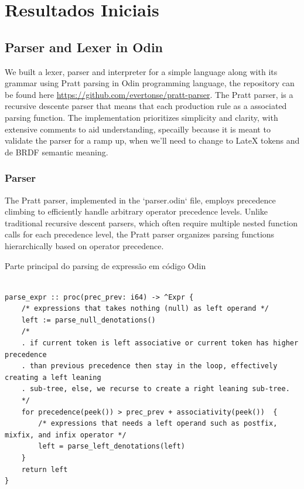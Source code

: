 \documentclass[english, 
               brazil, 
               bsc] %
               {dcomp-abntex2}
\begin{document}
\chapter{Resultados Iniciais}

\section{Parser and Lexer in Odin}

We built a lexer, parser and interpreter for a  simple language along with its grammar using Pratt parsing in Odin programming language, the repository can be found here \url{https://github.com/evertonse/pratt-parser}. The Pratt parser, is a recursive descente parser that means that each production rule as a associated parsing function. The implementation prioritizes simplicity and clarity, with extensive comments to aid understanding, specailly because it is meant to validate the parser for a ramp up, when we'll need to change to LateX tokens and de BRDF semantic meaning.

\subsection{Parser}

The Pratt parser, implemented in the `parser.odin` file, employs precedence climbing to efficiently handle arbitrary operator precedence levels. Unlike traditional recursive descent parsers, which often require multiple nested function calls for each precedence level, the Pratt parser organizes parsing functions hierarchically based on operator precedence.


\begin{algoritmo}[H]
	\caption{Parte principal do parsing de expressão em código Odin}
	\label{alg1}
	\label{alg1}
  \begin{lstlisting}

parse_expr :: proc(prec_prev: i64) -> ^Expr {
    /* expressions that takes nothing (null) as left operand */
    left := parse_null_denotations() 
    /*
    . if current token is left associative or current token has higher precedence
    . than previous precedence then stay in the loop, effectively creating a left leaning
    . sub-tree, else, we recurse to create a right leaning sub-tree.
    */
    for precedence(peek()) > prec_prev + associativity(peek())  {
        /* expressions that needs a left operand such as postfix, mixfix, and infix operator */
        left = parse_left_denotations(left)
    }
    return left
}

  \end{lstlisting}
\end{algoritmo}
\end{document}
